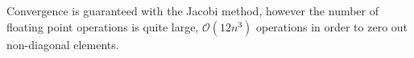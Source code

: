 \documentclass[%
 reprint,
 nobalancelastpage,
 amsmath,amssymb,
 aps,
]{revtex4-1}
\begin{document}
Convergence is guaranteed with the Jacobi method, however the number of floating point operations is quite large, $\mathcal{O}(12n^{3})$ operations in order to zero out non-diagonal elements.










\end{document}
